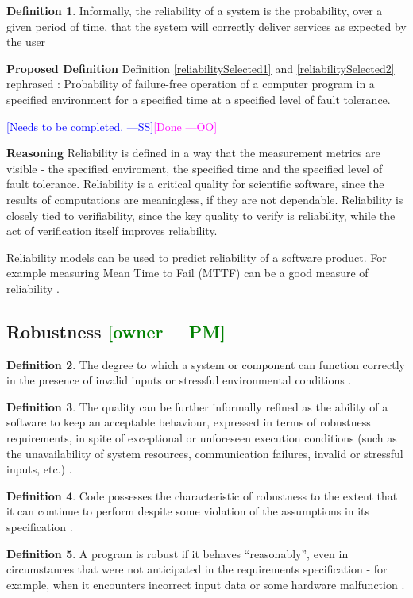 \documentclass[letterpaper,cleveref]{lipics-v2019}
\newcommand{\authornote}[3]{\textcolor{#1}{[#3 ---#2]}}
\newcommand{\authornote}[3]{}
\newcommand{\wss}[1]{\authornote{blue}{SS}{#1}} %
\newcommand{\oo}[1]{\authornote{magenta}{OO}{#1}} %
\newcommand{\pmi}[1]{\authornote{green}{PM}{#1}} %
\theoremstyle{definition}
\newtheorem{defn}{Definition}
\begin{document}
\begin{defn}
	Informally, the reliability of a system is the probability, over a given
	period of time, that the system will correctly deliver services as expected by
	the user \citep{sommerville}
\end{defn}

\noindent \textbf{Proposed Definition}
Definition \ref{reliabilitySelected1} and \ref{reliabilitySelected2} rephrased : 	Probability of failure-free operation of a computer program in a specified environment for a specified time at a specified level of fault tolerance.

\wss{Needs to be completed.}\oo{Done}

\noindent \textbf{Reasoning}
Reliability is defined in a way that the measurement metrics are visible - the specified enviroment, the specified time and the specified level of fault tolerance. Reliability is a critical quality for scientific software, since the results of
computations are meaningless, if they are not dependable.  Reliability is
closely tied to verifiability, since the key quality to verify is reliability,
while the act of verification itself improves reliability.

Reliability models can be used to predict reliability of a software product. For
example measuring Mean Time to Fail (MTTF) can be a good measure of reliability
\citep{berander2005software}.

\subsection{{Robustness} \pmi{owner}}
\begin{defn}
	The degree to which a system or component can function correctly in the
	presence of invalid inputs or stressful environmental conditions
	\citep{IEEEStdGlossarySET1990}.
\end{defn}
\begin{defn}
	The quality can be further informally refined as the ability of a software to
	keep an acceptable behaviour, expressed in terms of robustness requirements,
	in
	spite of exceptional or unforeseen execution conditions (such as the
	unavailability of system resources, communication failures, invalid or
	stressful inputs, etc.) \citep{fernandez2005model}.
\end{defn}
\begin{defn} \label{RobustnessPartialDefn}
	Code possesses the characteristic of robustness to the extent that it can
	continue to perform despite some violation of the assumptions in its
	specification \citep{boehm2007software}.
\end{defn}
\begin{defn} \label{RobustnessDefnSelected}
	A program is robust if it behaves ``reasonably'', even in circumstances that
	were not anticipated in the requirements specification - for example, when it
	encounters incorrect input data or some hardware malfunction
	\citep{ghezzi1991fundamentals}.
\end{defn}
\end{document}
